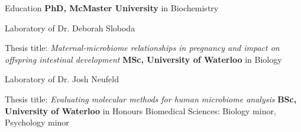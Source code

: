 \begin{rubric}{Education}
%
\entry*[]%
	\textbf{PhD, McMaster University} in Biochemistry
	
	Laboratory of Dr. Deborah Sloboda
 
        Thesis title: \textit{Maternal-microbiome relationships in pregnancy and impact on offspring intestinal development}
%
\entry*[]%
	\textbf{MSc, University of Waterloo} in Biology
	
	Laboratory of Dr. Josh Neufeld

        Thesis title: \textit{Evaluating molecular methods for human microbiome analysis}
%
\entry*[]%
	\textbf{BSc, University of Waterloo} in Honours Biomedical Sciences:
	Biology minor, Psychology minor
%	
\end{rubric}